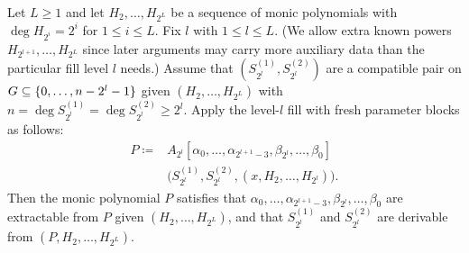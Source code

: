 \begin{lemma}\label{lem:fill-correctness}
    Let $L\ge 1$ and let $H_2, \ldots, H_{2^L}$ be a sequence of monic polynomials with $\deg H_{2^i} = 2^i$ for $1 \le i \le L$.
    Fix $l$ with $1\le l\le L$.
    (We allow extra known powers $H_{2^{l+1}},\ldots,H_{2^L}$ since later arguments may carry more auxiliary data than the particular fill level $l$ needs.)
    Assume that $(S^{(1)}_{2^l}, S^{(2)}_{2^l})$ are a compatible pair on $G \subseteq \{0,\dotsc,n - 2^l-1\}$ given $(H_2, \ldots, H_{2^L})$ with $n = \deg S^{(1)}_{2^l} = \deg S^{(2)}_{2^l} \ge 2^l$.
    Apply the level-$l$ fill with fresh parameter blocks as follows:
    \[
      \begin{aligned}
        P\coloneqq{}&A_{2^l}
          [\alpha_0,\ldots,\alpha_{2^{l+1}-3},
           \beta_{2^l},\ldots,\beta_0]\\
        &\bigl(S^{(1)}_{2^l},S^{(2)}_{2^l},
               (x,H_2,\ldots,H_{2^l})\bigr).
      \end{aligned}
    \]
    Then the monic polynomial $P$
    satisfies that $\alpha_0, \ldots, \alpha_{2^{l + 1} - 3}, \beta_{2^l}, \ldots, \beta_{0}$ are extractable from $P$ given $(H_2, \ldots, H_{2^L})$, and that $S^{(1)}_{2^l}$ and $S^{(2)}_{2^l}$ are derivable from $(P, H_2, \ldots, H_{2^L})$.
\end{lemma}
